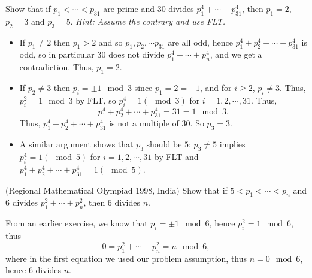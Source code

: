 \documentclass[11pt,dvipsnames]{book}
\numberwithin{equation}{section} %
\numberwithin{figure}{section} %
\numberwithin{table}{section} %
\begin{document}
\begin{exercise} Show that if $p_{1}<\cdots < p_{31}$ are prime and $30$ divides $p_{1}^{4}+\cdots + p_{31}^{4}$, then $p_{1}=2$, $p_{2}=3$ and $p_{3}=5$. {\it Hint: Assume the contrary and use FLT.}

\begin{solution}

\begin{itemize}
\item  If $p_1\neq 2$ then $p_1>2$ and so $p_1,p_2,\cdots p_{31}$ are all odd, hence $p_1^4+p_2^4+\cdots+p_{31}^4$ is odd, so in particular $30$ does not divide $ p_{1}^{4}+\cdots + p_{n}^{4}$, and we get a contradiction. Thus, $p_{1}=2$.

\item If $p_2\neq 3$ then $p_{i} = \pm 1\mod 3$ since $p_{1}=2 = -1$, and for $i\geq 2$, $p_{i}\neq 3$. Thus, $p_{i}^{2} = 1\mod 3$ by FLT, so $p_i^{4} = 1(\mod 3)$ for $i=1,2,\cdots,31$. Thus, 
\[
p_1^4+p_2^4+\cdots+p_{31}^4 = 31 = 1 \mod 3.
\]
Thus, $p_1^4+p_2^4+\cdots+p_{31}^4$ is not a multiple of $30$. So $p_3=3$. 
\item A similar argument shows that $p_3$ should be $5$: $p_3\neq 5 $ implies $ p_i^4 = 1 (\mod 5)$ for $i=1,2,\cdots,31$ by FLT and $p_1^4+p_2^4+\cdots+p_{31}^4 = 1 (\mod 5)$.
\end{itemize}
\end{solution}


\end{exercise}


\begin{exercise} (Regional Mathematical Olympiad 1998, India) Show that if $5<p_{1}<\cdots < p_{n}$ and $6$ divides $p_{1}^{2}+\cdots + p_{n}^{2}$, then $6$ divides $n$. 

\begin{solution}
From an earlier exercise, we know that $p_{i} = \pm 1 \mod 6$, hence $p_{i}^{2} = 1 \mod 6$, thus 
\[
0=p_{1}^{2}+\cdots + p_{n}^{2}  = n\mod 6,
\]
where in the first equation we used our problem assumption, thus $n = 0\mod 6$, hence $6$ divides $n$. 
\end{solution}


\end{exercise}


%
%
\end{document}
